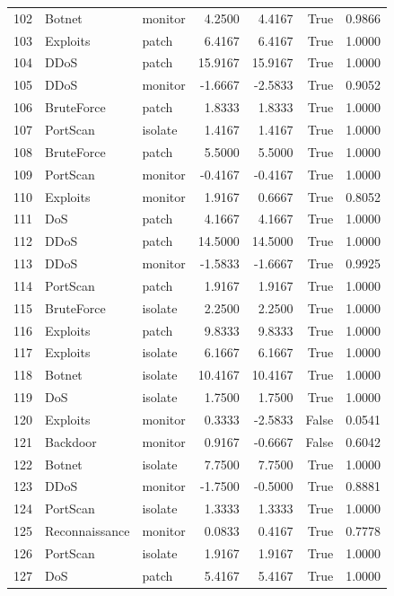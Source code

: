 \begin{table}
\begin{tabular}{rllrrrr}
102 & Botnet & monitor & 4.2500 & 4.4167 & True & 0.9866 \\
103 & Exploits & patch & 6.4167 & 6.4167 & True & 1.0000 \\
104 & DDoS & patch & 15.9167 & 15.9167 & True & 1.0000 \\
105 & DDoS & monitor & -1.6667 & -2.5833 & True & 0.9052 \\
106 & BruteForce & patch & 1.8333 & 1.8333 & True & 1.0000 \\
107 & PortScan & isolate & 1.4167 & 1.4167 & True & 1.0000 \\
108 & BruteForce & patch & 5.5000 & 5.5000 & True & 1.0000 \\
109 & PortScan & monitor & -0.4167 & -0.4167 & True & 1.0000 \\
110 & Exploits & monitor & 1.9167 & 0.6667 & True & 0.8052 \\
111 & DoS & patch & 4.1667 & 4.1667 & True & 1.0000 \\
112 & DDoS & patch & 14.5000 & 14.5000 & True & 1.0000 \\
113 & DDoS & monitor & -1.5833 & -1.6667 & True & 0.9925 \\
114 & PortScan & patch & 1.9167 & 1.9167 & True & 1.0000 \\
115 & BruteForce & isolate & 2.2500 & 2.2500 & True & 1.0000 \\
116 & Exploits & patch & 9.8333 & 9.8333 & True & 1.0000 \\
117 & Exploits & isolate & 6.1667 & 6.1667 & True & 1.0000 \\
118 & Botnet & isolate & 10.4167 & 10.4167 & True & 1.0000 \\
119 & DoS & isolate & 1.7500 & 1.7500 & True & 1.0000 \\
120 & Exploits & monitor & 0.3333 & -2.5833 & False & 0.0541 \\
121 & Backdoor & monitor & 0.9167 & -0.6667 & False & 0.6042 \\
122 & Botnet & isolate & 7.7500 & 7.7500 & True & 1.0000 \\
123 & DDoS & monitor & -1.7500 & -0.5000 & True & 0.8881 \\
124 & PortScan & isolate & 1.3333 & 1.3333 & True & 1.0000 \\
125 & Reconnaissance & monitor & 0.0833 & 0.4167 & True & 0.7778 \\
126 & PortScan & isolate & 1.9167 & 1.9167 & True & 1.0000 \\
127 & DoS & patch & 5.4167 & 5.4167 & True & 1.0000 \\

\end{tabular}
\end{table}
